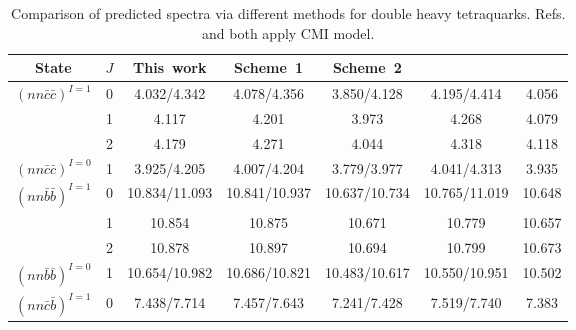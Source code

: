 \documentclass[prd,twocolumn,floatfix,nofootinbib]{revtex4}
\begin{document}
\renewcommand{\tabcolsep}{0.25cm}
\renewcommand{\arraystretch}{1.3}
\begin{table}[!htbp]
    \caption{Comparison of predicted spectra via different methods for double heavy tetraquarks. Refs.\cite{Luo:2017eub} and \cite{Lu:2020rog} both apply CMI model.}
    \label{tab:comparison}
    \begin{tabular}{ccccccc}
        \hline\hline
        {\rm State}     &$J$    &{\rm This\ work}       &\cite{Luo:2017eub} {\rm Scheme\ 1}  &\cite{Luo:2017eub} {\rm Scheme\ 2}  &\cite{Lu:2020rog}      &\cite{Ebert:2007rn} \\ \hline
        ${(nn\bar{c}\bar{c})}^{I=1}$
                        &0      &4.032/4.342            &4.078/4.356                         &3.850/4.128                         &4.195/4.414            &4.056 \\
                        &1      &4.117                  &4.201                               &3.973                               &4.268                  &4.079 \\
                        &2      &4.179                  &4.271                               &4.044                               &4.318                  &4.118 \\
        ${(nn\bar{c}\bar{c})}^{I=0}$
                        &1      &3.925/4.205            &4.007/4.204                         &3.779/3.977                         &4.041/4.313            &3.935 \\
        ${(nn\bar{b}\bar{b})}^{I=1}$
                        &0      &10.834/11.093          &10.841/10.937                       &10.637/10.734                       &10.765/11.019          &10.648 \\
                        &1      &10.854                 &10.875                              &10.671                              &10.779                 &10.657 \\
                        &2      &10.878                 &10.897                              &10.694                              &10.799                 &10.673 \\
        ${(nn\bar{b}\bar{b})}^{I=0}$
                        &1      &10.654/10.982          &10.686/10.821                       &10.483/10.617                       &10.550/10.951          &10.502 \\
        ${(nn\bar{c}\bar{b})}^{I=1}$
                        &0      &7.438/7.714            &7.457/7.643                         &7.241/7.428                         &7.519/7.740            &7.383 \\

\end{tabular}
\end{table}
\end{document}
